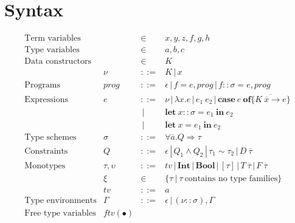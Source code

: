 \documentclass{article}
\newcommand{\hasgrammar}{::=}
\newcommand{\orprod}{\, | \,}
\newcommand{\multi}[1]{{\overline{#1}}}
\newcommand{\bvar}[2]{#1 :: #2}
\newcommand{\To}{\Rightarrow}
\begin{document}
\section{Syntax}

\[
\begin{array}{llcl}

\text{Term variables}    && \in & x, y, z, f, g, h \\
\text{Type variables}    && \in & a, b, c \\
\text{Data constructors} && \in & K \\

                         & \nu            & \hasgrammar & K \orprod x \\
\text{Programs}          & \textit{prog}  & \hasgrammar & \epsilon \orprod f = e, \textit{prog} \orprod \bvar{f}{\sigma} = e, \textit{prog} \\
\text{Expressions}       & e              & \hasgrammar & \nu \orprod \lambda x. e \orprod e_1 ~ e_2 \orprod \textbf{case} ~ e ~ \textbf{of} \{ \multi{K ~ \multi{x} \to e} \} \\
                         &                & \orprod     & \textbf{let} ~ \bvar{x}{\sigma} = e_1 ~ \textbf{in} ~ e_2 \\
                         &                & \orprod     & \textbf{let} ~ x = e_1 ~ \textbf{in} ~ e_2 \\
\text{Type schemes}      & \sigma         & \hasgrammar & \forall \multi{a}. Q \To \tau \\
\text{Constraints}       & Q              & \hasgrammar & \epsilon \orprod Q_1 \land Q_2 \orprod \tau_1 \sim \tau_2 \orprod D ~ \multi{\tau} \\
\text{Monotypes}         & \tau, \upsilon & \hasgrammar & \textit{tv} \orprod \textbf{Int} \orprod \textbf{Bool} \orprod [\tau] \orprod T ~ \multi{\tau} \orprod F ~ \multi{\tau} \\
                         & \xi            & \in         & \{ \tau ~ | ~ \tau ~ \text{contains no type families} \} \\
                         & \textit{tv}    & \hasgrammar & a \\
\text{Type environments} & \Gamma         & \hasgrammar & \epsilon \orprod (\bvar{\nu}{\sigma}),\Gamma \\

\text{Free type variables} & \textit{ftv}(\bullet) \\


\end{array}\]
\end{document}
